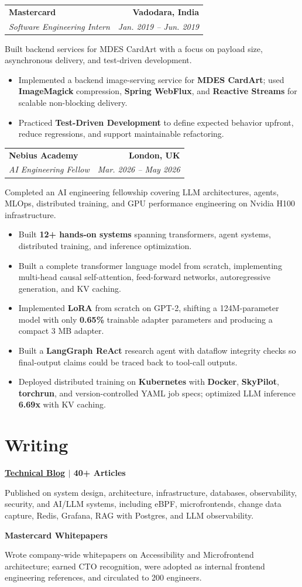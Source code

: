 \documentclass[a4paper,10pt]{article}
\makeatletter
\newcommand{\resumeItem}[1]{\item\small{#1}}
\newcommand{\resumeSubheading}[4]{%
  \vspace{1pt}
  \begin{tabular*}{\textwidth}[t]{l@{\extracolsep{\fill}}r}
    \textbf{#1} & \textbf{\small #2} \\
    \textit{\small #3} & \textit{\small #4} \\
  \end{tabular*}\vspace{-2pt}
}
\newcommand{\resumeRoleSummary}[1]{{\small #1\par}\vspace{-1pt}}
\newcommand{\compactEntry}[3]{%
  \textbf{#1}\hfill{\small\textbf{#2}}\\[-1pt]
  {\small #3\par}\vspace{2pt}
}
\newcommand{\resumeItemListStart}{\begin{itemize}}
\newcommand{\resumeItemListEnd}{\end{itemize}\vspace{-1pt}}
\makeatother
\begin{document}
\newpage
\resumeSubheading
  {Mastercard}{Vadodara, India}
  {Software Engineering Intern}{Jan. 2019 -- Jun. 2019}
\resumeRoleSummary{Built backend services for MDES CardArt with a focus on payload size, asynchronous delivery, and test-driven development.}
\resumeItemListStart
  \resumeItem{Implemented a backend image-serving service for \textbf{MDES CardArt}; used \textbf{ImageMagick} compression, \textbf{Spring WebFlux}, and \textbf{Reactive Streams} for scalable non-blocking delivery.}
  \resumeItem{Practiced \textbf{Test-Driven Development} to define expected behavior upfront, reduce regressions, and support maintainable refactoring.}
\resumeItemListEnd

\resumeSubheading
  {Nebius Academy}{London, UK}
  {AI Engineering Fellow}{Mar. 2026 -- May 2026}
\resumeRoleSummary{Completed an AI engineering fellowship covering LLM architectures, agents, MLOps, distributed training, and GPU performance engineering on Nvidia H100 infrastructure.}
\resumeItemListStart
  \resumeItem{Built \textbf{12+ hands-on systems} spanning transformers, agent systems, distributed training, and inference optimization.}
  \resumeItem{Built a complete transformer language model from scratch, implementing multi-head causal self-attention, feed-forward networks, autoregressive generation, and KV caching.}
  \resumeItem{Implemented \textbf{LoRA} from scratch on GPT-2, shifting a 124M-parameter model with only \textbf{0.65\%} trainable adapter parameters and producing a compact 3 MB adapter.}
  \resumeItem{Built a \textbf{LangGraph ReAct} research agent with dataflow integrity checks so final-output claims could be traced back to tool-call outputs.}
  \resumeItem{Deployed distributed training on \textbf{Kubernetes} with \textbf{Docker}, \textbf{SkyPilot}, \textbf{torchrun}, and version-controlled YAML job specs; optimized LLM inference \textbf{6.69x} with KV caching.}
\resumeItemListEnd


\section{Writing}
\compactEntry{\href{https://aymanace2049.hashnode.dev}{Technical Blog} $|$ 40+ Articles}{}{Published on system design, architecture, infrastructure, databases, observability, security, and AI/LLM systems, including eBPF, microfrontends, change data capture, Redis, Grafana, RAG with Postgres, and LLM observability.}
\compactEntry{Mastercard Whitepapers}{}{Wrote company-wide whitepapers on Accessibility and Microfrontend architecture; earned CTO recognition, were adopted as internal frontend engineering references, and circulated to 200 engineers.}
\end{document}
